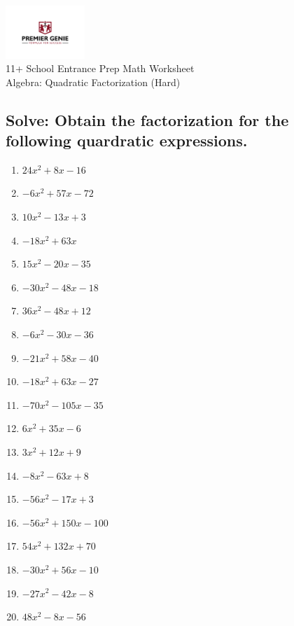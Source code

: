 \documentclass{article}
\begin{document}
\begin{center}
\includegraphics[width=3cm]{PREMGENIEJPG.jpg}\\
{\Large 11+ School Entrance Prep Math Worksheet}\\
{\Medium Algebra: Quadratic Factorization (Hard)}\\

\end{center}

\subsection*{Solve: Obtain the factorization for the following quardratic expressions.}

\begin{enumerate}
\item $\displaystyle 24 x^{2} + 8 x - 16 $ \ 
\item $\displaystyle - 6 x^{2} + 57 x - 72 $ \ 
\item $\displaystyle 10 x^{2} - 13 x + 3 $ \ 
\item $\displaystyle - 18 x^{2} + 63 x $ \ 
\item $\displaystyle 15 x^{2} - 20 x - 35 $ \ 
\item $\displaystyle - 30 x^{2} - 48 x - 18 $ \ 
\item $\displaystyle 36 x^{2} - 48 x + 12 $ \ 
\item $\displaystyle - 6 x^{2} - 30 x - 36 $ \ 
\item $\displaystyle - 21 x^{2} + 58 x - 40 $ \ 
\item $\displaystyle - 18 x^{2} + 63 x - 27 $ \ 
\item $\displaystyle - 70 x^{2} - 105 x - 35 $ \ 
\item $\displaystyle 6 x^{2} + 35 x - 6 $ \ 
\item $\displaystyle 3 x^{2} + 12 x + 9 $ \ 
\item $\displaystyle - 8 x^{2} - 63 x + 8 $ \ 
\item $\displaystyle - 56 x^{2} - 17 x + 3 $ \ 
\item $\displaystyle - 56 x^{2} + 150 x - 100 $ \ 
\item $\displaystyle 54 x^{2} + 132 x + 70 $ \ 
\item $\displaystyle - 30 x^{2} + 56 x - 10 $ \ 
\item $\displaystyle - 27 x^{2} - 42 x - 8 $ \ 
\item $\displaystyle 48 x^{2} - 8 x - 56 $ \ 


\end{enumerate}
\end{document}
